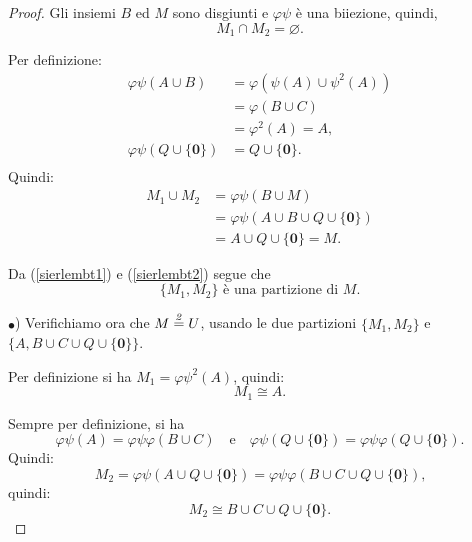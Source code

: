 \documentclass[a4paper,oneside,11pt]{book}
\theoremstyle{definition} \newtheorem{Def}{Definizione}
\theoremstyle{plain} \newtheorem{teo}{Teorema}
\theoremstyle{plain} \newtheorem{cor}[teo]{Corollario}
\theoremstyle{definition} \newtheorem{lem}[teo]{Lemma}
\theoremstyle{plain} \newtheorem{pro}[teo]{Proposizione}
\newcommand{\ug}[1]{(\ref{#1})} %
\newcommand{\eqn}[1]{\stackrel{\text{\textit{#1}}}{=}}
\begin{document}
\begin{proof}
		Gli insiemi $B$ ed $M$ sono disgiunti e $\varphi\psi$ è una biiezione, quindi,
		\begin{equation}\label{sierlembt1}
			M_1 \cap M_2 = \varnothing \text{.}
		\end{equation}
		
		Per definizione:
		\begin{equation*}
			\begin{aligned}
				\varphi\psi(A \cup B) &= \varphi(\psi(A) \cup \psi^2(A))\\
				&= \varphi(B \cup C)\\
				&= \varphi^2(A) = A \text{,} \\
				\varphi\psi(Q \cup \{\mathbf{0}\}) &= Q \cup \{\mathbf{0}\} \text{.} \\
			\end{aligned}
		\end{equation*}
		Quindi:
		\begin{equation}\label{sierlembt2}
			\begin{aligned}
				M_1 \cup M_2 &= \varphi\psi(B \cup M)\\
				&=\varphi\psi(A \cup B \cup Q \cup \{\mathbf{0}\})\\
				&= A \cup Q \cup \{\mathbf{0}\} = M \text{.}
			\end{aligned}
		\end{equation}
		
		Da \ug{sierlembt1} e \ug{sierlembt2} segue che
		\begin{equation}\label{sierlembt3}
			\{M_1, M_2\} \text{ è una partizione di } M \text{.}
		\end{equation}
		
		$\bullet$) Verifichiamo ora che $M \eqn{2} U$, usando le due partizioni $\{M_1, M_2\}$ e $\{A, B \cup C \cup Q \cup \{\mathbf{0}\}\}$.
		
		Per definizione si ha $M_1 = \varphi\psi^2(A)$, quindi:
		\begin{equation}\label{sierlembt4}
			M_1 \cong A \text{.}
		\end{equation}
		
		Sempre per definizione, si ha 
		\begin{equation*}
			\varphi\psi(A) = \varphi\psi\varphi(B \cup C) \quad  \text{e} \quad \varphi\psi(Q \cup \{\mathbf{0}\}) = \varphi\psi\varphi(Q \cup \{\mathbf{0}\}) \text{.}
		\end{equation*}
		Quindi:
		\begin{equation*}
			M_2 = \varphi\psi(A \cup Q \cup \{\mathbf{0}\}) = \varphi\psi\varphi(B \cup C \cup Q \cup \{\mathbf{0}\}) \text{,}
		\end{equation*}
		quindi:
		\begin{equation}\label{sierlembt5}
			M_2 \cong B \cup C \cup Q \cup \{\mathbf{0}\} \text{.}
		\end{equation}
		

\end{proof}
\end{document}
